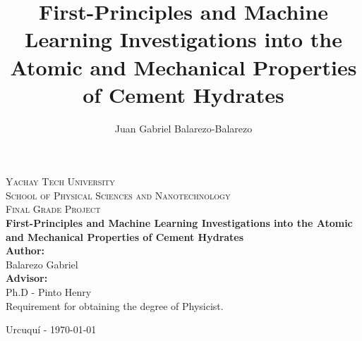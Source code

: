 \documentclass[12pt, titlepage, twoside, openright, usernames, dvipsnames]{thesis}
\title{First-Principles and Machine Learning Investigations into the Atomic and
       Mechanical Properties of Cement Hydrates}
\author{Juan Gabriel Balarezo-Balarezo}
\theoremstyle{definition}
\theoremstyle{definition}
\begin{document}
\begin{titlepage}
  \thispagestyle{fancy} %
  \fancyhf{} %

  
  \renewcommand{\headrulewidth}{0pt}

  \vspace*{2cm} %
  \begin{center}
    \textsc{\huge Yachay Tech University}\\
    \vspace*{1cm} %
    \textsc{\LARGE School of Physical Sciences and Nanotechnology}\\[1.5cm]
    \textsc{\LARGE Final Grade Project}\\[1cm]
    {\huge \bfseries First-Principles and Machine Learning Investigations into the Atomic and Mechanical Properties of Cement Hydrates}\\[2cm]
    {\large 
    \textbf{Author:}\\ 
    Balarezo Gabriel\\[1cm]

    \textbf{Advisor:} \\
    Ph.D - Pinto Henry\\[1cm]
    }
       \large Requirement for obtaining the degree of Physicist.
    \vspace{1cm}

    Urcuquí - \today
  \end{center}
\end{titlepage}
%
\end{document}
